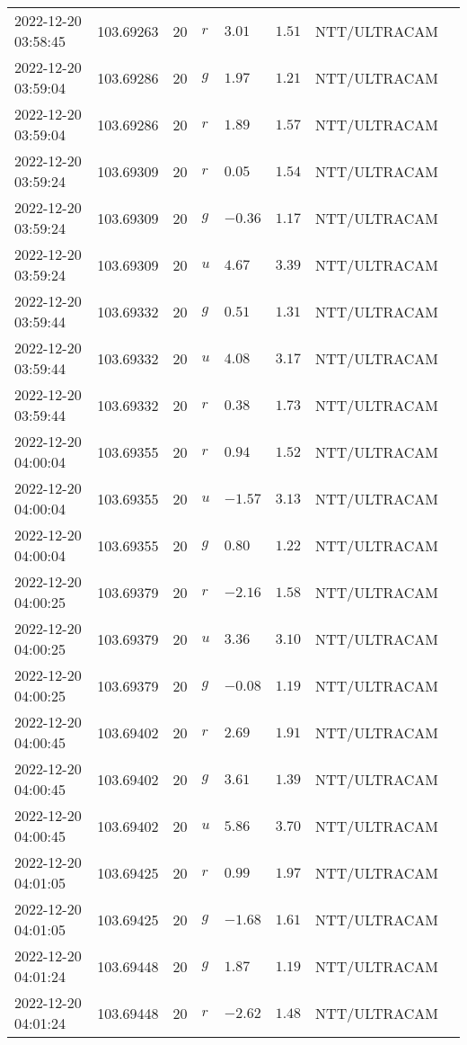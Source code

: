 \documentclass{nature_plusfigure}
\begin{document}
\begin{supplement}
\begin{center}
\begin{longtable}{llllllll}
2022-12-20 03:58:45 & 103.69263 & 20 & $r$ & $3.01$ & $1.51$ & NTT/ULTRACAM &  \\ 
2022-12-20 03:59:04 & 103.69286 & 20 & $g$ & $1.97$ & $1.21$ & NTT/ULTRACAM &  \\ 
2022-12-20 03:59:04 & 103.69286 & 20 & $r$ & $1.89$ & $1.57$ & NTT/ULTRACAM &  \\ 
2022-12-20 03:59:24 & 103.69309 & 20 & $r$ & $0.05$ & $1.54$ & NTT/ULTRACAM &  \\ 
2022-12-20 03:59:24 & 103.69309 & 20 & $g$ & $-0.36$ & $1.17$ & NTT/ULTRACAM &  \\ 
2022-12-20 03:59:24 & 103.69309 & 20 & $u$ & $4.67$ & $3.39$ & NTT/ULTRACAM &  \\ 
2022-12-20 03:59:44 & 103.69332 & 20 & $g$ & $0.51$ & $1.31$ & NTT/ULTRACAM &  \\ 
2022-12-20 03:59:44 & 103.69332 & 20 & $u$ & $4.08$ & $3.17$ & NTT/ULTRACAM &  \\ 
2022-12-20 03:59:44 & 103.69332 & 20 & $r$ & $0.38$ & $1.73$ & NTT/ULTRACAM &  \\ 
2022-12-20 04:00:04 & 103.69355 & 20 & $r$ & $0.94$ & $1.52$ & NTT/ULTRACAM &  \\ 
2022-12-20 04:00:04 & 103.69355 & 20 & $u$ & $-1.57$ & $3.13$ & NTT/ULTRACAM &  \\ 
2022-12-20 04:00:04 & 103.69355 & 20 & $g$ & $0.80$ & $1.22$ & NTT/ULTRACAM &  \\ 
2022-12-20 04:00:25 & 103.69379 & 20 & $r$ & $-2.16$ & $1.58$ & NTT/ULTRACAM &  \\ 
2022-12-20 04:00:25 & 103.69379 & 20 & $u$ & $3.36$ & $3.10$ & NTT/ULTRACAM &  \\ 
2022-12-20 04:00:25 & 103.69379 & 20 & $g$ & $-0.08$ & $1.19$ & NTT/ULTRACAM &  \\ 
2022-12-20 04:00:45 & 103.69402 & 20 & $r$ & $2.69$ & $1.91$ & NTT/ULTRACAM &  \\ 
2022-12-20 04:00:45 & 103.69402 & 20 & $g$ & $3.61$ & $1.39$ & NTT/ULTRACAM &  \\ 
2022-12-20 04:00:45 & 103.69402 & 20 & $u$ & $5.86$ & $3.70$ & NTT/ULTRACAM &  \\ 
2022-12-20 04:01:05 & 103.69425 & 20 & $r$ & $0.99$ & $1.97$ & NTT/ULTRACAM &  \\ 
2022-12-20 04:01:05 & 103.69425 & 20 & $g$ & $-1.68$ & $1.61$ & NTT/ULTRACAM &  \\ 
2022-12-20 04:01:24 & 103.69448 & 20 & $g$ & $1.87$ & $1.19$ & NTT/ULTRACAM &  \\ 
2022-12-20 04:01:24 & 103.69448 & 20 & $r$ & $-2.62$ & $1.48$ & NTT/ULTRACAM &  \\ 

\end{longtable}
\end{center}
\end{supplement}
\end{document}
